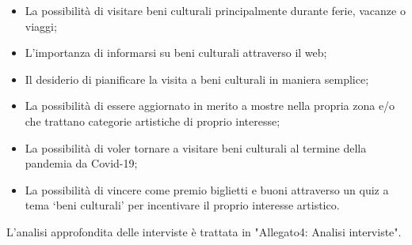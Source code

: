 \documentclass{article}
\begin{document}
\begin{itemize}
\item La possibilità di visitare beni culturali principalmente durante ferie, vacanze o viaggi;
\item L’importanza di informarsi su beni culturali attraverso il web;
\item Il desiderio di pianificare la visita a beni culturali in maniera semplice;
\item La possibilità di essere aggiornato in merito a mostre nella propria zona e/o che trattano categorie artistiche di proprio interesse;
\item La possibilità di voler tornare a visitare beni culturali al termine della pandemia da Covid-19;
\item La possibilità di vincere come premio biglietti e buoni attraverso un quiz a tema ‘beni culturali’ per incentivare il proprio interesse artistico.
\end{itemize}
L'analisi approfondita delle interviste è trattata in "Allegato4: Analisi interviste"\cite{Allegato4}.
\end{document}
